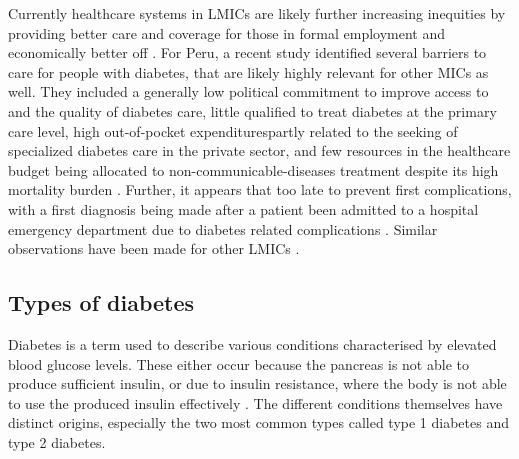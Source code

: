 Currently healthcare systems in \acp{LMIC} are likely further increasing inequities by providing better care and coverage for those in formal employment and economically better off \parencite{Mills2014,DiCesare2013}. For Peru, a recent study identified several barriers to care for people with diabetes, that are likely highly relevant for other \acp{MIC} as well. They included a generally low political commitment to improve access to and the quality of diabetes care, little qualified \DIFdelbegin {}\DIFdelend \DIFaddbegin {}\DIFaddend to treat diabetes at the primary care level, high out-of-pocket expenditures\DIFaddbegin \DIFadd{, }\DIFaddend partly related to the seeking of specialized diabetes care in the private sector, and few resources in the healthcare budget being allocated to non-communicable-diseases treatment despite its high mortality burden \parencite{Cardenas2016}. Further, it appears that \DIFdelbegin {}\DIFdelend \DIFaddbegin {}\DIFaddend too late to prevent first complications, with a first diagnosis \DIFdelbegin {}\DIFdelend \DIFaddbegin {}\DIFaddend being made after a patient \DIFdelbegin {}\DIFdelend \DIFaddbegin {}\DIFaddend been admitted to a hospital emergency department due to diabetes related complications \parencite{Cardenas2016}. Similar observations have been made for other \acp{LMIC} \parencite{Beran2015,WHO2014}.

 
\subsection{Types of diabetes}

Diabetes is a term used to describe various conditions characterised by elevated blood glucose levels. These either occur because the pancreas is not able to produce sufficient insulin, or due to insulin resistance, where the body is not able to use the produced insulin effectively \parencite{WorldHealthOrganization2016}. The different conditions themselves have distinct origins, especially the two most common types called type 1 diabetes and type 2 diabetes. 

